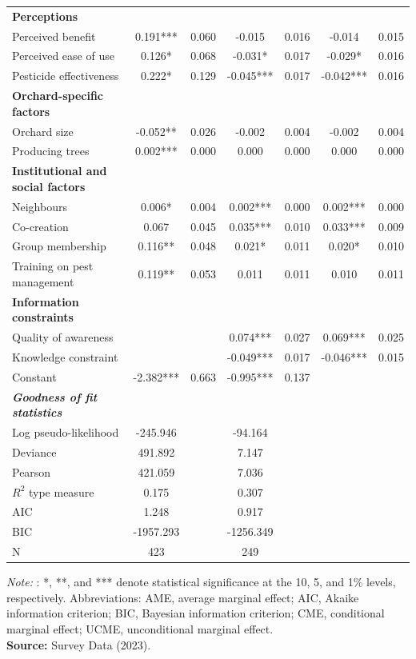 \documentclass[fleqn,twoside,reqno]{article}
\begin{document}
\begin{table}[!ht]
\begin{adjustbox}{width=1\textwidth, center}
\begin{tabular}{lcccccc}
\textbf{Perceptions} \\
Perceived benefit & 0.191*** & 0.060 & -0.015 & 0.016 & -0.014 & 0.015 \\
Perceived ease of use & 0.126* & 0.068 & -0.031* & 0.017 & -0.029* & 0.016 \\
Pesticide effectiveness & 0.222* & 0.129 & -0.045*** & 0.017 & -0.042*** & 0.016 \\

\textbf{Orchard-specific factors} \\
Orchard size & -0.052** & 0.026 & -0.002 & 0.004 & -0.002 & 0.004 \\
Producing trees & 0.002*** & 0.000 & 0.000 & 0.000 & 0.000 & 0.000 \\

\textbf{Institutional and social factors} \\
Neighbours & 0.006* & 0.004 & 0.002*** & 0.000 & 0.002*** & 0.000 \\
Co-creation & 0.067 & 0.045 & 0.035*** & 0.010 & 0.033*** & 0.009 \\
Group membership & 0.116** & 0.048 & 0.021* & 0.011 & 0.020* & 0.010 \\
Training on pest management & 0.119** & 0.053 & 0.011 & 0.011 & 0.010 & 0.011 \\

\textbf{Information constraints} \\
Quality of awareness & & & 0.074*** & 0.027 & 0.069*** & 0.025 \\
Knowledge constraint & & & -0.049*** & 0.017 & -0.046*** & 0.015 \\
Constant & -2.382*** & 0.663 & -0.995*** & 0.137 &\\ 
\midrule
\textbf{\textit{Goodness of fit statistics}} \\
Log pseudo-likelihood & -245.946 & & -94.164 & & & \\
Deviance & 491.892 & & 7.147 & & & \\
Pearson & 421.059 & & 7.036 & & & \\
$R^2$ type measure & 0.175 & & 0.307 & & & \\
AIC & 1.248 & & 0.917 & & & \\
BIC & -1957.293 & & -1256.349 & & & \\
\midrule
N & 423 & & 249 & & & \\
\bottomrule
\end{tabular}
\end{adjustbox}
\smallskip
    \parbox{0.9\textwidth}{\small\textit{Note:} : *, **, and *** denote statistical significance at the 10, 5, and 1\% levels, respectively. Abbreviations: AME, average marginal effect; AIC, Akaike information criterion; BIC, Bayesian information criterion; CME, conditional marginal effect; UCME, unconditional marginal effect.\\
    \textbf{Source:} Survey Data (2023).}
\end{table}
\end{document}
